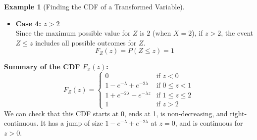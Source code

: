 \documentclass[11pt]{article}
\theoremstyle{definition}
\newtheorem{example}[definition]{Example}
\begin{document}
\begin{example}[Finding the CDF of a Transformed Variable]
\begin{itemize}
    \item \textbf{Case 4: $z > 2$} \\
    Since the maximum possible value for $Z$ is $2$ (when $X=2$), if $z > 2$, the event $Z \le z$ includes all possible outcomes for $Z$.
    \[ F_Z(z) = P(Z \le z) = 1 \]
\end{itemize}

\textbf{Summary of the CDF $F_Z(z)$:}
\[
F_Z(z) =
\begin{cases}
0 & \text{if } z < 0 \\
1 - e^{-\lambda} + e^{-2\lambda} & \text{if } 0 \le z < 1 \\
1 + e^{-2\lambda} - e^{-\lambda z} & \text{if } 1 \le z \le 2 \\
1 & \text{if } z > 2
\end{cases}
\]
We can check that this CDF starts at 0, ends at 1, is non-decreasing, and right-continuous. It has a jump of size $1 - e^{-\lambda} + e^{-2\lambda}$ at $z=0$, and is continuous for $z>0$.
\end{example}
\end{document}
